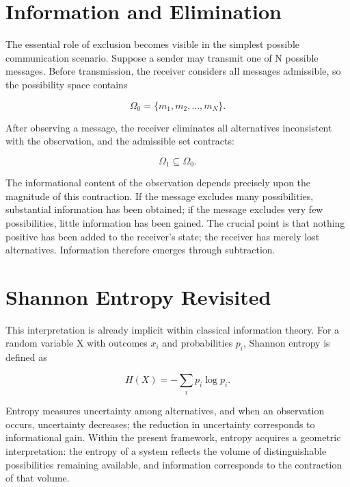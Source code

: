 \documentclass[11pt,oneside]{book}
\theoremstyle{plain}
\theoremstyle{definition}
\theoremstyle{remark}
\begin{document}
\section{Information and Elimination}

The essential role of exclusion becomes visible in the simplest possible communication scenario. Suppose a sender may transmit one of N possible messages. Before transmission, the receiver considers all messages admissible, so the possibility space contains

\begin{equation}
\Omega_0
=
\{m_1,m_2,\ldots,m_N\}.
\end{equation}

After observing a message, the receiver eliminates all alternatives inconsistent with the observation, and the admissible set contracts:

\begin{equation}
\Omega_1
\subseteq
\Omega_0.
\end{equation}

The informational content of the observation depends precisely upon the magnitude of this contraction. If the message excludes many possibilities, substantial information has been obtained; if the message excludes very few possibilities, little information has been gained. The crucial point is that nothing positive has been added to the receiver's state; the receiver has merely lost alternatives. Information therefore emerges through subtraction.

\section{Shannon Entropy Revisited}

This interpretation is already implicit within classical information theory. For a random variable X with outcomes \(x_i\) and probabilities \(p_i\), Shannon entropy is defined as

\begin{equation}
H(X)
=
-\sum_i p_i
\log p_i.
\end{equation}

Entropy measures uncertainty among alternatives, and when an observation occurs, uncertainty decreases; the reduction in uncertainty corresponds to informational gain. Within the present framework, entropy acquires a geometric interpretation: the entropy of a system reflects the volume of distinguishable possibilities remaining available, and information corresponds to the contraction of that volume.
\end{document}
